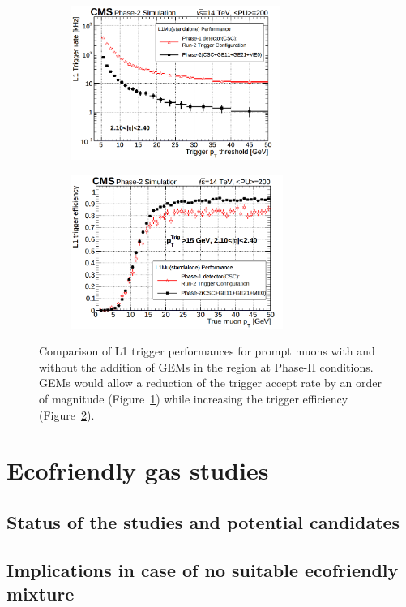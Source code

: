 	\begin{figure}[H]
		\begin{subfigure}{0.5\linewidth}
			\centering
			\includegraphics[height=5cm]{fig/chapt3/GEM-trigger-rate.png}
			\caption{\label{fig:CSC-GEM-perf:A}}
		\end{subfigure}
		\begin{subfigure}{0.5\linewidth}
			\centering
			\includegraphics[height=5cm]{fig/chapt3/GEM-trigger-eff.png}
			\caption{\label{fig:CSC-GEM-perf:B}}
		\end{subfigure}
		\caption{\label{fig:CSC-GEM-perf} Comparison of L1 trigger performances for prompt muons with and without the addition of GEMs in the region  at Phase-II conditions. GEMs would allow a reduction of the trigger accept rate by an order of magnitude (Figure~\ref{fig:CSC-GEM-perf:A}) while increasing the trigger efficiency (Figure~\ref{fig:CSC-GEM-perf:B}).}
	\end{figure}

\section{Ecofriendly gas studies}
\label{chapt3:sec:EcoGas}

	\subsection{Status of the studies and potential candidates}
	\label{chapt3:ssec:GasStatus}

	\subsection{Implications in case of no suitable ecofriendly mixture}
	\label{chapt3:ssec:GasConsequences}

\clearpage{\pagestyle{empty}\cleardoublepage}